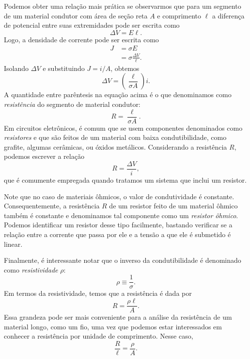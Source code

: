 Podemos obter uma relação mais prática se observarmos que para um segmento de um material condutor com área de seção reta $A$ e comprimento $\ell$ a diferença de potencial entre suas extremidades pode ser escrita como
\begin{equation}
    \Delta V = E\ell.
\end{equation}
%
Logo, a densidade de corrente pode ser escrita como
\begin{align}
    J &= \sigma E \\
    &= \sigma \frac{\Delta V}{\ell}.
\end{align}
%
Isolando $\Delta V$ e substituindo $J = i / A$, obtemos
\begin{equation}
    \Delta V = \left(\frac{\ell}{\sigma A}\right) i.
\end{equation}
%
A quantidade entre parêntesis na equação acima é o que denominamos como \emph{resistência} do segmento de material condutor:
\begin{equation}
    R = \frac{\ell}{\sigma A}.
\end{equation}
%
Em circuitos eletrônicos, é comum que se usem componentes denominados como \emph{resistores} e que são feitos de um material com baixa condutibilidade, como grafite, algumas cerâmicas, ou óxidos metálicos. Considerando a resistência $R$, podemos escrever a relação
\begin{equation}
    R = \frac{\Delta V}{i},
\end{equation}
%
que é comumente empregada quando tratamos um sistema que inclui um resistor.

Note que no caso de materiais ôhmicos, o valor de condutividade é constante. Consequentemente, a resistência $R$ de um resistor feito de um material ôhmico também é constante e denominamos tal componente como um \emph{resistor ôhmico}. Podemos identificar um resistor desse tipo facilmente, bastando verificar se a relação entre a corrente que passa por ele e a tensão a que ele é submetido é linear.

Finalmente, é interessante notar que o inverso da condutibilidade é denominado como \emph{resistividade} $\rho$:
\begin{equation}
    \rho \equiv \frac{1}{\sigma}.
\end{equation}
%
Em termos da resistividade, temos que a resistência é dada por
\begin{equation}
    R = \frac{\rho \ell}{A}.
\end{equation}
%
Essa grandeza pode ser mais conveniente para a análise da resistência de um material longo, como um fio, uma vez que podemos estar interessados em conhecer a resistência por unidade de comprimento. Nesse caso,
\begin{equation}
    \frac{R}{\ell} = \frac{\rho}{A}.
\end{equation}

